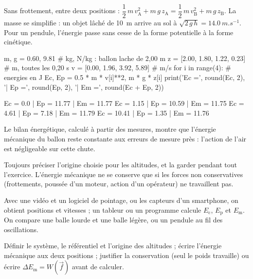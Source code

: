\begin{propriete}
Sans frottement, entre deux positions : $\dfrac{1}{2}\,m\,v_\mathrm{A}^2+m\,g\,z_\mathrm{A}=\dfrac{1}{2}\,m\,v_\mathrm{B}^2+m\,g\,z_\mathrm{B}$. La masse se simplifie : un objet lâché de \qty{10}{m}
arrive au sol à $\sqrt{2\,g\,h}=\qty{14,0}{m.s^{-1}}$. Pour un pendule, l'énergie passe sans cesse de la forme potentielle à la forme cinétique.
\end{propriete}
\par{}
\begin{python}
m, g = 0.60, 9.81                   # kg, N/kg : ballon lache de 2,00 m
z = [2.00, 1.80, 1.22, 0.23]        # m, toutes les 0,20 s
v = [0.00, 1.96, 3.92, 5.89]        # m/s
for i in range(4):                  # energies en J
    Ec, Ep = 0.5 * m * v[i]**2, m * g * z[i]
    print('Ec =', round(Ec, 2), '| Ep =', round(Ep, 2), '| Em =', round(Ec + Ep, 2))
\end{python}
\begin{console}
Ec = 0.0 | Ep = 11.77 | Em = 11.77
Ec = 1.15 | Ep = 10.59 | Em = 11.75
Ec = 4.61 | Ep = 7.18 | Em = 11.79
Ec = 10.41 | Ep = 1.35 | Em = 11.76
\end{console}
\noindent{} Le bilan énergétique, calculé à partir des mesures, montre que l'énergie mécanique du ballon reste constante
aux erreurs de mesure près : l'action de l'air est négligeable sur cette chute.
\begin{attention}
Toujours préciser l'origine choisie pour les altitudes, et la garder pendant tout l'exercice. L'énergie mécanique ne se conserve
que si les forces non conservatives (frottements, poussée d'un moteur, action d'un opérateur) ne travaillent pas.
\end{attention}
\begin{experience}
Avec une vidéo et un logiciel de pointage, ou les capteurs d'un smartphone, on obtient positions et vitesses ; un tableur ou un
programme calcule $E_\mathrm{c}$, $E_\mathrm{p}$ et $E_\mathrm{m}$. On compare une balle lourde et une balle légère, ou un pendule au fil des oscillations.
\end{experience}
\begin{rediger}
Définir le système, le référentiel et l'origine des altitudes ; écrire l'énergie mécanique aux deux positions ; justifier la
conservation (seul le poids travaille) ou écrire $\Delta E_\mathrm{m}=W(\vec{f})$ avant de calculer.
\end{rediger}
\exercices

